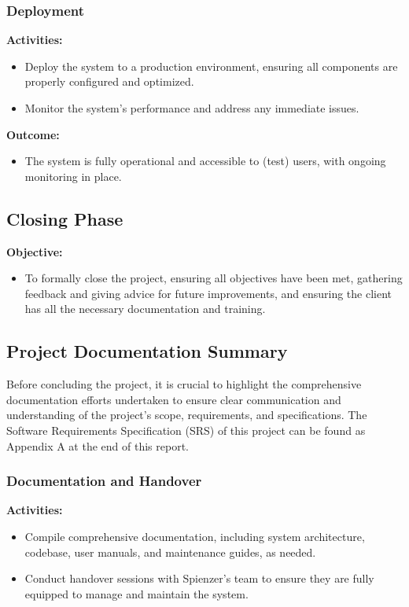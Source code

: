 \documentclass[12pt,a4paper]{article}
\begin{document}
\subsubsection{Deployment}

\noindent \textbf{Activities:}
\begin{itemize}
    \item Deploy the system to a production environment, ensuring all components are properly configured and optimized.
    \item Monitor the system's performance and address any immediate issues.
\end{itemize}

\noindent \textbf{Outcome:}
\begin{itemize}
    \item The system is fully operational and accessible to (test) users, with ongoing monitoring in place.
\end{itemize}

\subsection{Closing Phase}

\noindent \textbf{Objective:}
\begin{itemize}
    \item To formally close the project, ensuring all objectives have been met, gathering feedback and giving advice for future improvements, and ensuring the client has all the necessary documentation and training.
\end{itemize}
\subsection{Project Documentation Summary}
Before concluding the project, it is crucial to highlight the comprehensive documentation efforts undertaken to ensure clear communication and understanding of the project's scope, requirements, and specifications. The Software Requirements Specification (SRS) of this project can be found as Appendix A at the end of this report.

\subsubsection{Documentation and Handover}

\noindent \textbf{Activities:}
\begin{itemize}
    \item Compile comprehensive documentation, including system architecture, codebase, user manuals, and maintenance guides, as needed.
    \item Conduct handover sessions with Spienzer's team to ensure they are fully equipped to manage and maintain the system.
\end{itemize}
\end{document}
